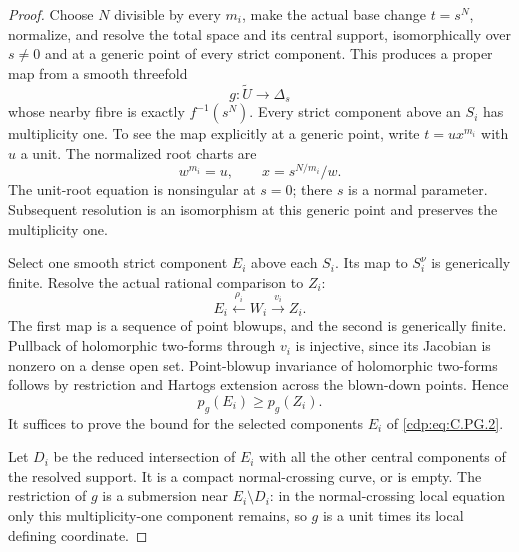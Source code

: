 \begin{proof}
Choose $N$ divisible by every $m_i$, make the actual
base change $t=s^N$, normalize, and resolve the total
space and its central support, isomorphically over
$s\ne0$ and at a generic point of every strict
component. This produces a proper map from a smooth
threefold
\[
                         g:\widetilde U\to\Delta_s
                                                               \tag{C.PG.2}\label{cdp:eq:C.PG.2}
\]
whose nearby fibre is exactly $f^{-1}(s^N)$.
Every strict component above an $S_i$ has multiplicity
one. To see the map explicitly at a generic point,
write $t=u x^{m_i}$ with $u$ a unit. The normalized
root charts are
\[
       w^{m_i}=u,\qquad x=s^{N/m_i}/w.
                                                               \tag{C.PG.3}\label{cdp:eq:C.PG.3}
\]
The unit-root equation is nonsingular at $s=0$;
there $s$ is a normal parameter. Subsequent
resolution is an isomorphism at this generic
point and preserves the multiplicity one.

Select one smooth strict component $E_i$ above each
$S_i$. Its map to $S_i^\nu$ is generically finite.
Resolve the actual rational comparison to $Z_i$:
\[
              E_i\xleftarrow{\rho_i}W_i
                            \xrightarrow{v_i}Z_i.
                                                               \tag{C.PG.4}\label{cdp:eq:C.PG.4}
\]
The first map is a sequence of point blowups,
and the second is generically finite. Pullback
of holomorphic two-forms through $v_i$ is
injective, since its Jacobian is nonzero on
a dense open set. Point-blowup invariance of
holomorphic two-forms follows by restriction
and Hartogs extension across the blown-down
points. Hence
\[
                         p_g(E_i)\ge p_g(Z_i).
                                                               \tag{C.PG.5}\label{cdp:eq:C.PG.5}
\]
It suffices to prove the bound for the selected
components $E_i$ of \eqref{cdp:eq:C.PG.2}.

Let $D_i$ be the reduced intersection of $E_i$
with all the other central components of the
resolved support. It is a compact normal-crossing
curve, or is empty. The restriction of $g$ is
a submersion near $E_i\setminus D_i$: in the
normal-crossing local equation only this
multiplicity-one component remains, so $g$
is a unit times its local defining coordinate.


\end{proof}

